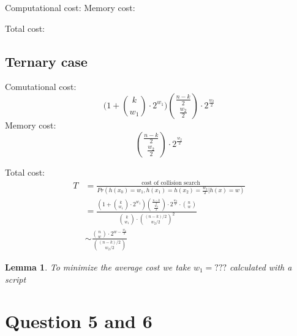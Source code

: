 \documentclass[12pt]{article}
\newtheorem{lemma}{Lemma}
\begin{document}
Computational cost:
Memory cost:

Total cost:


\subsection{Ternary case}
Comutational cost:
\[
\Big(1+ \binom{k}{w_1} \cdot 2^{w_1}\Big)\binom{\frac{n-k}{2}}{\frac{w_2}{2}} \cdot 2^{\frac{w_2}{2}}
\]
Memory cost:
\[
\binom{\frac{n-k}{2}}{\frac{w_2}{2}} \cdot 2^{\frac{w_2}{2}}
\]

Total cost:
\[
\begin{split}
  T & = \frac{\text{cost of collision search}}{Pr(h(x_0) = w_1, h(x_1) = h(x_2) = \frac{w_2}{2} | h(x) = w)} \\
  & = \frac{(1+ \binom{k}{w_1}\cdot 2^{w_1})\binom{\frac{n-k}{2}}{\frac{w_2}{2}}\cdot 2^{\frac{w_2}{2}}\cdot \binom{n}{w}}{\binom{k}{w_1} \cdot \binom{(n-k)/2}{w_2/2}^{2}} \\
  & \sim \frac{\binom{n}{w} \cdot 2^{w - \frac{w_2}{2}}}{\binom{(n-k)/2}{w_2/2}}
\end{split}
\]
\begin{lemma}
To minimize the average cost we take $w_1 = ???$ calculated with a script
\end{lemma}
\section{Question 5 and 6}




\end{document}
